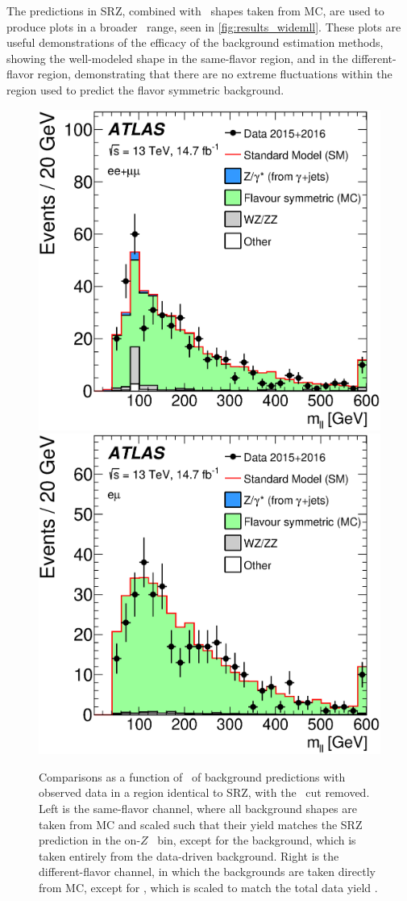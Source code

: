 The predictions in SRZ, combined with \mll~shapes taken from \ac{MC}, are used to produce plots in a broader \mll~range, seen in \autoref{fig:results_widemll}. These plots are useful demonstrations of the efficacy of the background estimation methods, showing the well-modeled \dyjets shape in the same-flavor region, and in the different-flavor region, demonstrating that there are no extreme fluctuations within the region used to predict the flavor symmetric background.

\begin{centering}
\begin{figure}[!hbt]
\myfloatalign
\includegraphics[width=.48\linewidth]{figures/results/mll_SF_R_a_SCALED.eps}
\includegraphics[width=.48\linewidth]{figures/results/mll_DF_R_a_SCALED.eps}
\caption{Comparisons as a function of \mll~of background predictions with observed data in a region identical to SRZ, with the \mll~cut removed. Left is the same-flavor channel, where all background shapes are taken from \ac{MC} and scaled such that their yield matches the SRZ prediction in the on-$Z$ \mll~bin, except for the \dyjets background, which is taken entirely from the data-driven background. Right is the different-flavor channel, in which the backgrounds are taken directly from \ac{MC}, except for \ttbar, which is scaled to match the total data yield \cite{this_paper}. }
\label{fig:results_widemll}
\end{figure}
\end{centering}

